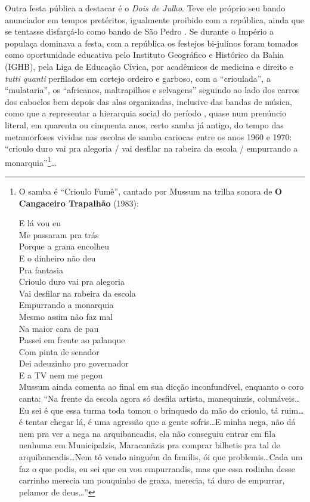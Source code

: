 Outra festa pública a destacar é o \textit{Dois de Julho}. Teve ele próprio seu bando anunciador em tempos pretéritos, igualmente proibido com a república, ainda que se tentasse disfarçá-lo como bando de São Pedro \cite[p.~43]{albuquerque_doisdejulho_1997}. Se durante o Império a populaça dominava a festa, com a república os festejos bi-julinos foram tomados como oportunidade educativa pelo Instituto Geográfico e Histórico da Bahia (IGHB), pela Liga de Educação Cívica, por acadêmicos de medicina e direito e \textit{tutti quanti} perfilados em cortejo ordeiro e garboso, com a ``crioulada'', a ``mulataria'', os ``africanos, maltrapilhos e selvagens'' seguindo ao lado dos carros dos caboclos bem depois das alas organizadas, inclusive das bandas de música, como que a representar a hierarquia social do período \cite[p.~49]{albuquerque_doisdejulho_1997}, quase num prenúncio literal, em quarenta ou cinquenta anos, certo samba já antigo, do tempo das metamorfoses vividas nas escolas de samba cariocas entre os anos 1960 e 1970: ``crioulo duro vai pra alegoria / vai desfilar na rabeira da escola / empurrando a monarquia''\footnote{O samba é ``Crioulo Fumê'', cantado por Mussum na trilha sonora de \textbf{O Cangaceiro Trapalhão} (1983):

E lá vou eu \\
Me passaram pra trás \\
Porque a grana encolheu \\
E o dinheiro não deu \\
Pra fantasia \\

Crioulo duro vai pra alegoria \\
Vai desfilar na rabeira da escola \\
Empurrando a monarquia \\

Mesmo assim não faz mal \\
Na maior cara de pau \\
Passei em frente ao palanque \\

Com pinta de senador \\
Dei adeuzinho pro governador \\
E a TV nem me pegou \\

Mussum ainda comenta ao final em sua dicção inconfundível, enquanto o coro canta: ``Na frente da escola agora só desfila artista, manequinzis, colunáveis\dots Eu sei é que essa turma toda tomou o brinquedo da mão do crioulo, tá ruim\dots é tentar chegar lá, é uma agressão que a gente sofris\dots E minha nega, não dá nem pra ver a nega na arquibancadis, ela não conseguiu entrar em fila nenhuma em Municipalzis, Maracanãzis pra comprar bilhetis pra tal de arquibancadis\dots Nem tô vendo ninguém da famílis, ói que problemis\dots Cada um faz o que podis, eu sei que eu vou empurrandis, mas que essa rodinha desse carrinho merecia um pouquinho de graxa, merecia, tá duro de empurrar, pelamor de deus\dots'' }\dots

